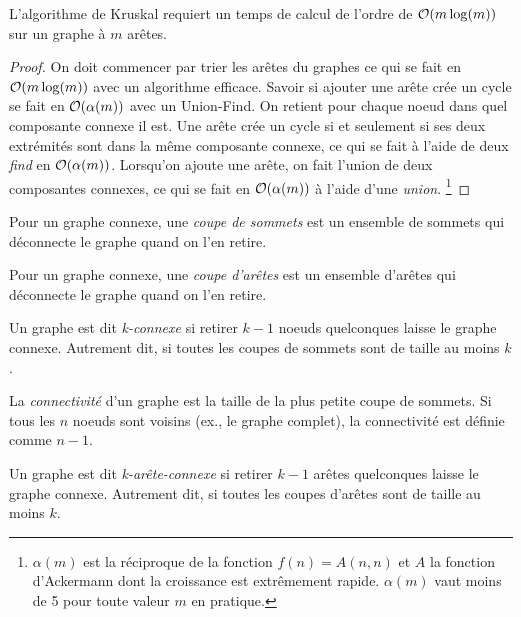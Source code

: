 \begin{mytheo} 
  L'algorithme de Kruskal requiert un temps de calcul de l'ordre de $\mathcal{O}(m\log(m))$ sur un graphe à $m$ arêtes.
  \begin{proof}
    On doit commencer par trier les arêtes du graphes ce qui se fait en $\mathcal{O}(m\log(m))$ avec un algorithme efficace.
    Savoir si ajouter une arête crée un cycle se fait en $\mathcal{O}(\alpha(m))$ avec un Union-Find.
    On retient pour chaque noeud dans quel composante connexe il est.
    Une arête crée un cycle si et seulement si ses deux extrémités sont dans la même composante connexe,
    ce qui se fait à l'aide de deux \emph{find} en $\mathcal{O}(\alpha(m))$.
    Lorsqu'on ajoute une arête, on fait l'union de deux composantes connexes,
    ce qui se fait en $\mathcal{O}(\alpha(m))$ à l'aide d'une \emph{union}.
    \footnote{$\alpha(m)$ est la réciproque de la fonction $f(n) = A(n,n)$ et
    $A$ la fonction d'Ackermann dont la croissance est extrêmement rapide.
    $\alpha(m)$ vaut moins de 5 pour toute valeur $m$ en pratique.}
  \end{proof}
\end{mytheo}

\begin{mydef}
  Pour un graphe connexe, une \emph{coupe de sommets} est un ensemble de sommets qui déconnecte le graphe quand on l'en retire.
\end{mydef}

\begin{mydef}
  Pour un graphe connexe, une \emph{coupe d'arêtes} est un ensemble d'arêtes qui déconnecte le graphe quand on l'en retire.
\end{mydef}

\begin{mydef}
  Un graphe est dit \emph{k-connexe} si retirer $k − 1$ noeuds quelconques laisse le graphe connexe. Autrement dit, si toutes les coupes de sommets sont de taille au moins $k$.
\end{mydef}

\begin{mydef}
   La \emph{connectivité} d'un graphe est la taille de la plus petite coupe de sommets. Si tous les $n$ noeuds sont voisins (ex., le graphe complet), la connectivité est définie comme $n − 1$.
\end{mydef}

\begin{mydef}
   Un graphe est dit \emph{k-arête-connexe} si retirer $k − 1$ arêtes quelconques laisse le graphe connexe. Autrement dit, si toutes les coupes d'arêtes sont de taille au moins $k$.
\end{mydef}

